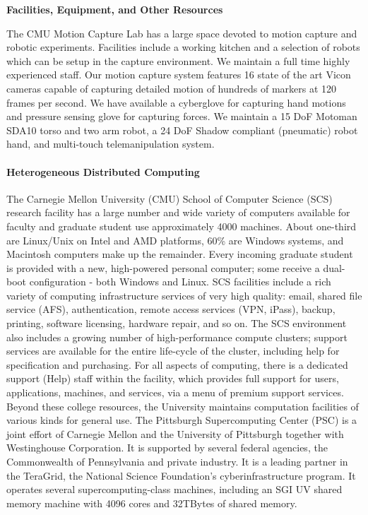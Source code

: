 \documentclass[11pt]{article}
\begin{document}
 

\begin{center}
{\large \bf Facilities, Equipment, and Other Resources}
\end{center}
 
\noindent
The CMU Motion Capture Lab has a large space devoted to motion capture and robotic experiments. Facilities include a working kitchen and a selection of robots which can be setup in the capture environment. We maintain a full time highly experienced staff.  Our motion capture system features 16 state of the art Vicon cameras capable of capturing detailed motion of hundreds of markers at 120 frames per second. We have available a cyberglove for capturing hand motions and pressure sensing glove for capturing forces.    We maintain a 15 DoF Motoman SDA10 torso and two arm robot, a 24 DoF Shadow compliant (pneumatic) robot hand, and multi-touch telemanipulation system.   


\paragraph{Heterogeneous Distributed Computing}
The Carnegie Mellon University (CMU) School of Computer Science (SCS) research facility has a large number and wide
variety of computers available for faculty and graduate student use approximately 4000 machines. About one-third
are Linux/Unix on Intel and AMD platforms, 60\% are Windows systems, and Macintosh computers make up the
remainder. Every incoming graduate student is provided with a new, high-powered personal computer; some receive a
dual-boot configuration - both Windows and Linux. SCS facilities include a rich variety of computing infrastructure
services of very high quality: email, shared file service (AFS), authentication, remote access services (VPN, iPass),
backup, printing, software licensing, hardware repair, and so on. The SCS environment also includes a growing number
of high-performance compute clusters; support services are available for the entire life-cycle of the cluster, including
help for specification and purchasing. For all aspects of computing, there is a dedicated support (Help) staff within the
facility, which provides full support for users, applications, machines, and services, via a menu of premium support
services.
Beyond these college resources, the University maintains computation facilities of various kinds for general use. The
Pittsburgh Supercomputing Center (PSC) is a joint effort of Carnegie Mellon and the University of Pittsburgh together
with Westinghouse Corporation. It is supported by several federal agencies, the Commonwealth of Pennsylvania and
private industry. It is a leading partner in the TeraGrid, the National Science Foundation's cyberinfrastructure program.
It operates several supercomputing-class machines, including an SGI UV shared memory machine with 4096 cores and
32TBytes of shared memory.
\end{document}
